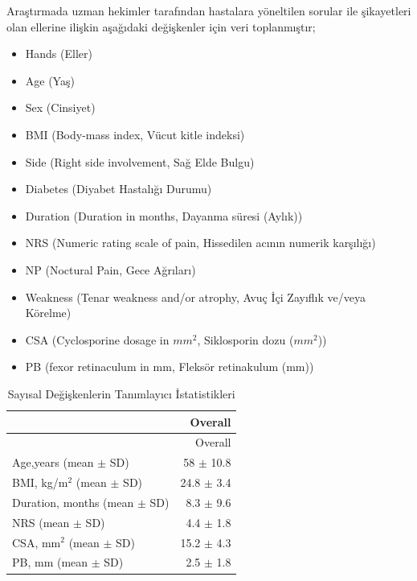 \documentclass[12pt,twoside]{deuthesis}
\begin{document}
Araştırmada uzman hekimler tarafından hastalara yöneltilen sorular ile şikayetleri olan ellerine ilişkin aşağıdaki değişkenler için veri toplanmıştır;
\begin{itemize}
\item
  Hands (Eller)
\item
  Age (Yaş)
\item
  Sex (Cinsiyet)
\item
  BMI (Body-mass index, Vücut kitle indeksi)
\item
  Side (Right side involvement, Sağ Elde Bulgu)
\item
  Diabetes (Diyabet Hastalığı Durumu)
\item
  Duration (Duration in months, Dayanma süresi (Aylık))
\item
  NRS (Numeric rating scale of pain, Hissedilen acının numerik karşılığı)
\item
  NP (Noctural Pain, Gece Ağrıları)
\item
  Weakness (Tenar weakness and/or atrophy, Avuç İçi Zayıflık ve/veya Körelme)
\item
  CSA (Cyclosporine dosage in \(mm^2\), Siklosporin dozu (\(mm^2\)))
\item
  PB (fexor retinaculum in mm, Fleksör retinakulum (mm))
\end{itemize}
\begin{longtable}[]{@{}lr@{}}
\caption{\label{tab:overall} Sayısal Değişkenlerin Tanımlayıcı İstatistikleri}\tabularnewline
\toprule
& Overall \\
\midrule
\endfirsthead
\toprule
& Overall \\
\midrule
\endhead
Age,years (mean \(\pm\) SD) & 58 \(\pm\) 10.8 \\
BMI, kg/m\(^2\) (mean \(\pm\) SD) & 24.8 \(\pm\) 3.4 \\
Duration, months (mean \(\pm\) SD) & 8.3 \(\pm\) 9.6 \\
NRS (mean \(\pm\) SD) & 4.4 \(\pm\) 1.8 \\
CSA, mm\(^2\) (mean \(\pm\) SD) & 15.2 \(\pm\) 4.3 \\
PB, mm (mean \(\pm\) SD) & 2.5 \(\pm\) 1.8 \\
\bottomrule
\end{longtable}
\end{document}
